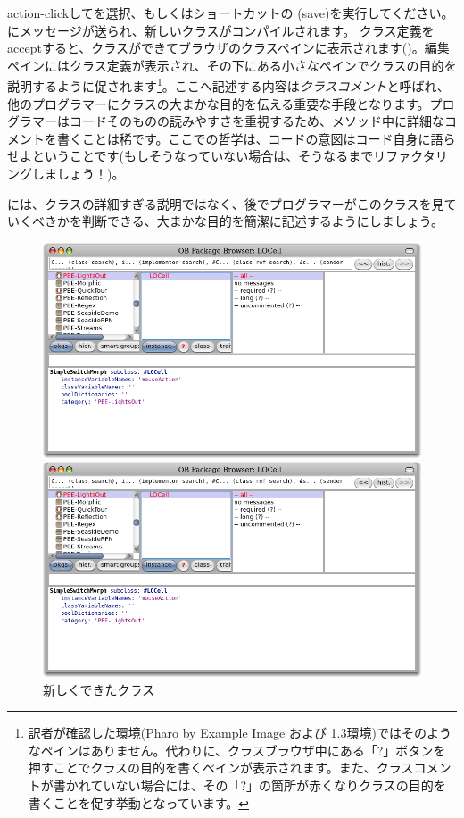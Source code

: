 \documentclass[a4paper,10pt,twoside]{book}
\begin{document}
action-clickしてを選択、もしくはショートカットの (save)を実行してください。にメッセージが送られ、新しいクラスがコンパイルされます。
クラス定義をacceptすると、クラスができてブラウザのクラスペインに表示されます()。編集ペインにはクラス定義が表示され、その下にある小さなペインでクラスの目的を説明するように促されます\footnote{訳者が確認した環境(Pharo by Example Image および 1.3環境)ではそのようなペインはありません。代わりに、クラスブラウザ中にある「?」ボタンを押すことでクラスの目的を書くペインが表示されます。また、クラスコメントが書かれていない場合には、その「?」の箇所が赤くなりクラスの目的を書くことを促す挙動となっています。}。ここへ記述する内容は\emph{クラスコメント}と呼ばれ、他のプログラマーにクラスの大まかな目的を伝える重要な手段となります。\st プログラマーはコードそのものの読みやすさを重視するため、メソッド中に詳細なコメントを書くことは稀です。ここでの哲学は、コードの意図はコード自身に語らせよということです(もしそうなっていない場合は、そうなるまでリファクタリングしましょう！)。


には、クラスの詳細すぎる説明ではなく、後でプログラマーがこのクラスを見ていくべきかを判断できる、大まかな目的を簡潔に記述するようにしましょう。


\begin{figure}[h!t]
\ifluluelse
	{\centerline {\includegraphics[width=\textwidth]{LOCell}}}
	{\centerline {\includegraphics[scale=0.7]{LOCell}}}
\caption{新しくできたクラス }
\end{figure}
\end{document}
